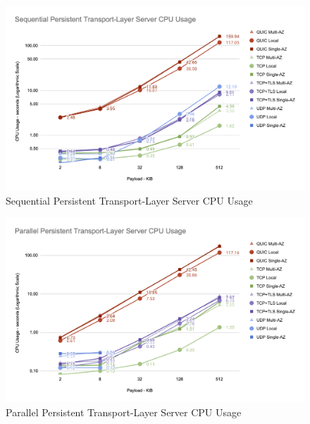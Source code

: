 \begin{figure}[h!]
    \centering
    \includegraphics[width=\linewidth]{figures/charts/Sequential Persistent Transport-Layer Server CPU Usage.png}
    \caption{Sequential Persistent Transport-Layer Server CPU Usage}
    \label{fig:sequential_server_transport_cpu}
\end{figure}
\begin{figure}[h!]
    \centering
    \includegraphics[width=\linewidth]{figures/charts/Parallel Persistent Transport-Layer Server CPU Usage.png}
    \caption{Parallel Persistent Transport-Layer Server CPU Usage}
    \label{fig:parallel_server_transport_cpu}
\end{figure}
